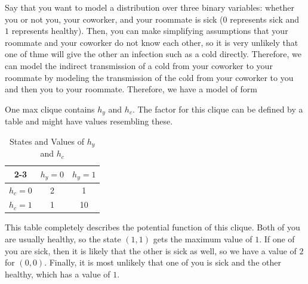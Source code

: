 \documentclass{article}
\begin{document}
  \begin{example}
    \label{ex:transmission-of-colds}
 
    Say that you want to model a distribution over three binary variables: whether you or not you, your coworker, and your roommate is sick ($0$ represents sick and $1$ represents healthy). Then, you can make simplifying assumptions that your roommate and your coworker do not know each other, so it is very unlikely that one of thme will give the other an infection such as a cold directly. Therefore, we can model the indirect transmission of a cold from your coworker to your roommate by modeling the transmission of the cold from your coworker to you and then you to your roommate. Therefore, we have a model of form

    \begin{center}
    \end{center}
    One max clique contains $h_y$ and $h_c$. The factor for this clique can be defined by a table and might have values resembling these. 

    \begin{table}[H]
      \centering
      \begin{tabular}{c|c|c|}
      \cline{2-3}
      & \( h_y = 0 \) & \( h_y = 1 \) \\ \hline
      \multicolumn{1}{|c|}{\( h_c = 0 \)} & 2 & 1 \\ \hline
      \multicolumn{1}{|c|}{\( h_c = 1 \)} & 1 & 10 \\ \hline
      \end{tabular}
      \caption{States and Values of \( h_y \) and \( h_c \)}
    \end{table}

    This table completely describes the potential function of this clique. Both of you are usually healthy, so the state $(1, 1)$ gets the maximum value of $1$. If one of you are sick, then it is likely that the other is sick as well, so we have a value of $2$ for $(0, 0)$. Finally, it is most unlikely that one of you is sick and the other healthy, which has a value of $1$. 
  \end{example}
\end{document}
